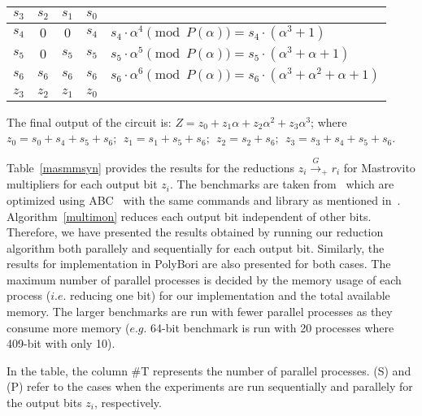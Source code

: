 \begin{Example}
{\vspace{0.05in}

{\small
{\begin{tabular}{|c c c c | l }
  $s_3$   &$s_2$    &$s_1$   &$s_0$   &   \\
 \hline
 $s_4$    &$0$    &$0$   &$s_4$   &$s_4\cdot \alpha^4 \pmod{P(\alpha)} = s_4 \cdot (\alpha^3 + 1)$\\
 $s_5$    &$0$    &$s_5$   &$s_5$     &$s_5\cdot \alpha^5 \pmod{P(\alpha)} = s_5\cdot (\alpha^3+ \alpha + 1)$\\
 $s_6$    &$s_6$    &$s_6$   &$s_6$     &$s_6\cdot \alpha^6 \pmod{ P(\alpha)} = s_6\cdot( \alpha^3 + \alpha^2 + \alpha + 1)$\\
 \hline
 $z_3$    &$z_2$    &$z_1$   &$z_0$   &
 \end{tabular}\par}
}

\vspace{0.05in}

The final output of the circuit is: $Z = z_0 + z_1 \alpha + z_2
\alpha^2 + z_3 \alpha^3$; where  $z_0=s_0+s_4+s_5+s_6; ~~z_1=s_1+s_5+s_6;
~~z_2=s_2+s_6; ~~z_3=s_3+s_4+s_5+s_6$. 
}
\end{Example}

\par Table~\ref{masmmsyn} provides the results for the reductions $z_i \xrightarrow{G}_+ r_i$ for Mastrovito multipliers for each output bit $z_i$.
The benchmarks are taken from~\cite{lv:tcad2013} which are optimized using ABC~\cite{ABCtool} with the same commands and library as mentioned in~\cite{cunxi:aspdac17}. Algorithm~\ref{multimon} reduces each output bit independent of other bits. Therefore, we have presented the results obtained by running our reduction algorithm both parallely and sequentially for each output bit. Similarly, the results for implementation in PolyBori are also presented for both cases. The maximum number of parallel processes is decided by the memory usage of each process ($i.e.$ reducing one bit) for our implementation and the total available memory. The larger benchmarks are run with fewer parallel processes as they consume more memory ($e.g.$ 64-bit 
benchmark is run with 20 processes where 409-bit with only 10). 


\par In the table, the column \#T represents the number of parallel processes. (S) and (P) refer to the cases when the experiments are run sequentially and parallely for the output bits $z_i$, respectively. 

